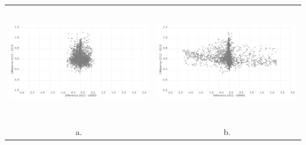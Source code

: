 \documentclass{standalone}
\begin{document}
\tiny
\centering 

\begin{tabular}{m{} m{}}
\multicolumn{1}{c}{\includegraphics[height=50mm]{../../images/graphs/scatterplot_diff_baseline_usped.png}}
& \multicolumn{1}{c}{\includegraphics[height=50mm]{../../images/graphs/scatterplot_diff_baseline_simwe.png}}\\
\\
\multicolumn{1}{c}{a.} 
& \multicolumn{1}{c}{b.}\\
\end{tabular}
\end{document}
